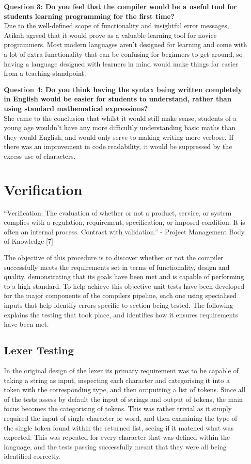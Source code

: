 \documentclass[
]{report}
\begin{document}
\textbf{Question 3: Do you feel that the compiler would be a useful tool
for students learning programming for the first time?}\\
Due to the well-defined scope of functionality and insightful error
messages, Atikah agreed that it would prove as a valuable learning tool
for novice programmers. Most modern languages aren't designed for
learning and come with a lot of extra functionality that can be
confusing for beginners to get around, so having a language designed
with learners in mind would make things far easier from a teaching
standpoint.

\textbf{Question 4: Do you think having the syntax being written
completely in English would be easier for students to understand, rather
than using standard mathematical \glspl{expression}?}\\
She came to the conclusion that whilst it would still make sense,
students of a young age wouldn't have any more difficultly understanding
basic maths than they would English, and would only serve to making
writing more verbose. If there was an improvement in code readability,
it would be suppressed by the excess use of characters.

\section{Verification}
``Verification. The evaluation of whether or not a product, service, or
system complies with a regulation, requirement, specification, or
imposed condition. It is often an internal process. Contrast with
validation.'' - Project Management Body of Knowledge {[}7{]}

The objective of this procedure is to discover whether or not the
compiler successfully meets the requirements set in terms of
functionality, design and quality, demonstrating that its goals have
been met and is capable of performing to a high standard. To help
achieve this objective unit tests have been developed for the major
components of the compilers pipeline, each one using specialised inputs
that help identify errors specific to section being tested. The
following explains the testing that took place, and identifies how it
ensures requirements have been met.

\subsection{Lexer Testing}
In the original design of the lexer its primary requirement was to be
capable of taking a string as input, inspecting each character and
categorising it into a \gls{token} with the corresponding type, and then
outputting a list of \glspl{token}. Since all of the tests assess by default
the input of strings and output of \glspl{token}, the main focus becomes the
categorising of \glspl{token}. This was rather trivial as it simply required
the input of single character or word, and then examining the type of
the single \gls{token} found within the returned list, seeing if it matched
what was expected. This was repeated for every character that was
defined within the language, and the tests passing successfully meant
that they were all being identified correctly.
\end{document}
